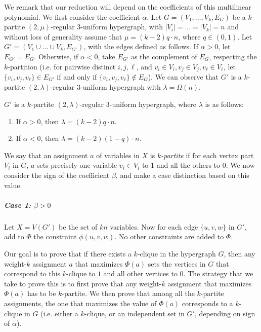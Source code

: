 \documentclass[a4paper,UKenglish,cleveref, autoref, thm-restate,numberwithinsect]{lipics-v2021}
\begin{document}
 We remark that our reduction will depend on the coefficients of this multilinear polynomial.
We first consider the coefficient $\alpha$.
Let $G = (V_1, \dots, V_k, E_G)$ be a $k$-partite $(2,\mu)$-regular $3$-uniform hypergraph, with $|V_i| = \dots = |V_k| = n$ and without loss of generality assume that $\mu = (k-2)q\cdot n$, where $q\in (0,1)$.
Let $G' = (V_1\cup \dots\cup V_k, E_{G'})$, with the edges defined as follows.
If $\alpha >0$, let $E_{G'}=E_G$.
Otherwise, if $\alpha<0$, take $E_{G'}$ as the complement of $E_G$, respecting the $k$-partition (i.e. for pairwise distinct $i,j,\ell$, and $v_i\in V_i, v_j\in V_j, v_\ell\in V_\ell$, let $\{v_i,v_j, v_\ell\}\in E_{G'}$ if and only if $\{v_i,v_j, v_\ell\}\notin E_G$).
We can observe that $G'$ is a $k$-partite $(2,\lambda)$-regular $3$-uniform hypergraph with $\lambda = \Omega(n)$.
\begin{observation}\label{obs:regularity-of-G'}
    $G'$ is a $k$-partite $(2,\lambda)$-regular $3$-uniform hypergraph, where $\lambda$ is as follows:
    \begin{enumerate}
        \item If $\alpha>0$, then $\lambda = (k-2)q\cdot n$.
        \item If $\alpha<0$, then $\lambda = (k-2)(1-q)\cdot n$.
    \end{enumerate}
\end{observation}
\medskip
We say that an assignment $a$ of variables in $X$ is \emph{$k$-partite} if for each vertex part $V_i$ in $G$, $a$ sets precisely one variable $v_i\in V_i$ to $1$ and all the others to $0$. 
We now consider the sign of the coefficient $\beta$, and make a case distinction based on this value.
\subparagraph*{{Case 1: $\beta>0$}} 
\begin{construction}\label{construction:b>0}
    Let $X = V(G')$ be the set of $kn$ variables.
    Now for each edge $\{u,v,w\}$ in $G'$, add to $\Phi$ the constraint $\phi(u,v,w)$.
    No other constraints are added to $\Phi$.
\end{construction}
Our goal is to prove that if there exists a $k$-clique in the hypergraph $G$, then any weight-$k$ assignment $a$ that maximizes $\Phi(a)$ sets the vertices in $G$ that correspond to this $k$-clique to $1$ and all other vertices to $0$. 
The strategy that we take to prove this is to first prove that any weight-$k$ assignment that maximizes $\Phi(a)$ has to be $k$-partite. We then prove that among all the $k$-partite assignments, the one that maximizes the value of $\Phi(a)$ corresponds to a $k$-clique in $G$ (i.e. either a $k$-clique, or an independent set in $G'$, depending on sign of $\alpha$). 
\end{document}
